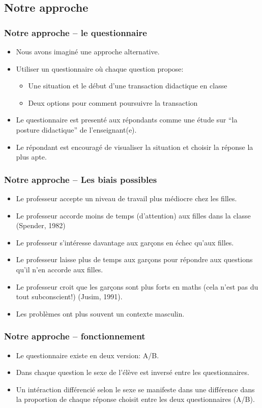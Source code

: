 \documentclass{beamer}
\begin{document}
\subsection{Notre approche}
\begin{frame}
\frametitle{Notre approche -- le questionnaire}
\begin{itemize}
\item Nous avons imaginé une approche alternative.
\item Utiliser un questionnaire où chaque question propose:
  \begin{itemize}
   \item Une situation et le début d'une transaction didactique en classe
   \item Deux options pour comment poursuivre la transaction 
  \end{itemize}
\item Le questionnaire est presenté aux répondants comme une étude sur
  ``la posture didactique'' de l'enseignant(e).
\item Le répondant est encouragé de visualiser la situation et choisir la
  réponse la plus apte. 
\end{itemize}
\end{frame}

\begin{frame}
\frametitle{Notre approche -- Les biais possibles}
\begin{itemize}
\item Le professeur accepte un niveau de travail plus médiocre chez les filles.
\item Le professeur accorde moins de temps (d’attention) aux filles dans la classe (Spender, 1982)
\item Le professeur s’intéresse davantage aux garçons en échec qu’aux filles.
\item Le professeur laisse plus de temps aux garçons pour répondre aux questions qu’il n’en accorde aux filles.
\item Le professeur croit que les garçons sont plus forts en maths (cela n’est pas du tout subconscient!) (Jusim, 1991).
\item Les problèmes ont plus souvent un contexte masculin.
\end{itemize}
\end{frame}

\begin{frame}
\frametitle{Notre approche -- fonctionnement}
\begin{itemize}
\item Le questionnaire existe en deux version: A/B.
\item Dans chaque question le sexe de l'élève est inversé entre les questionnaires.
\item Un intéraction différencié selon le sexe se manifeste dans une différence
dans la proportion de chaque réponse choisit entre les deux questionnaires (A/B). 
  
\end{itemize}
\end{frame}
\end{document}
